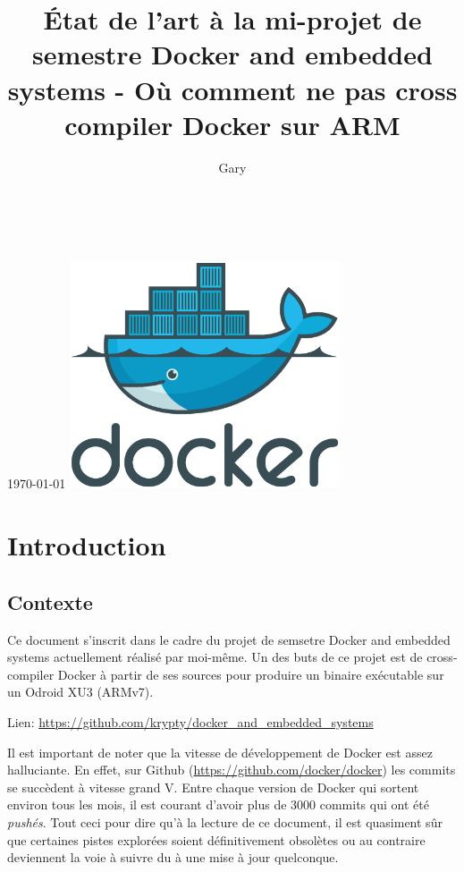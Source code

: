 \documentclass[11pt,a4paper,oneside]{report}
\title{État de l'art à la mi-projet de semestre Docker and embedded systems - Où comment ne pas cross compiler Docker sur ARM}
\author{Gary \bsc{Marigliano}}
\begin{document}
\begin{titlepage}
  \centering
  \vfill
  \LARGE \thetitle\\[0.8cm]

  \Large \theauthor\\[0.8cm]

  \normalsize \today
  \vfill
  \includegraphics[width=8cm]{img/docker_logo}
  \vfill
\end{titlepage}

\tableofcontents
{}

\chapter{Introduction}

\section{Contexte}

Ce document s'inscrit dans le cadre du projet de semsetre Docker and embedded systems actuellement réalisé par moi-même. Un des buts de ce projet est de cross-compiler Docker à partir de ses sources pour produire un binaire exécutable sur un Odroid XU3 (ARMv7).

Lien: \url{https://github.com/krypty/docker_and_embedded_systems}

Il est important de noter que la vitesse de développement de Docker est assez halluciante. En effet, sur Github (\url{https://github.com/docker/docker}) les commits se succèdent à vitesse grand V. Entre chaque version de Docker qui sortent environ tous les mois, il est courant d'avoir plus de 3000 commits qui ont été \emph{pushés}. Tout ceci pour dire qu'à la lecture de ce document, il est quasiment sûr que certaines pistes explorées soient définitivement obsolètes ou au contraire deviennent la voie à suivre du à une mise à jour quelconque.
\end{document}
